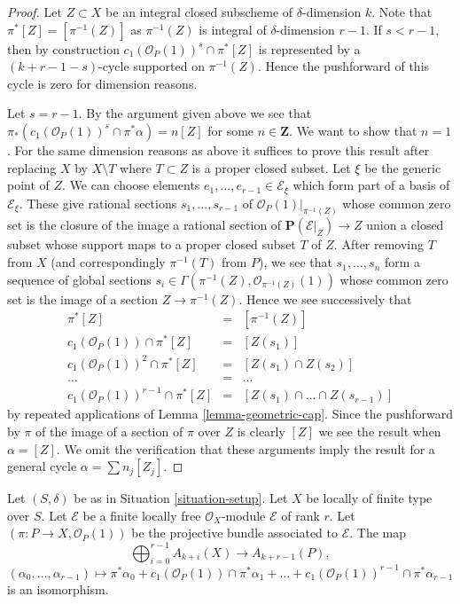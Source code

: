 \begin{proof}
Let $Z \subset X$ be an integral closed subscheme of $\delta$-dimension $k$.
Note that $\pi^*[Z] = [\pi^{-1}(Z)]$ as $\pi^{-1}(Z)$ is integral of
$\delta$-dimension $r - 1$.
If $s < r - 1$, then by construction
$c_1(\mathcal{O}_P(1))^s \cap \pi^*[Z]$
is represented by a $(k + r - 1 - s)$-cycle supported on
$\pi^{-1}(Z)$. Hence the pushforward of this cycle
is zero for dimension reasons.

\medskip\noindent
Let $s = r - 1$. By the argument given above we see that
$\pi_*(c_1(\mathcal{O}_P(1))^s \cap \pi^*\alpha) = n [Z]$
for some $n \in \mathbf{Z}$. We want to show that $n = 1$.
For the same dimension reasons
as above it suffices to prove this result after replacing $X$ by
$X \setminus T$ where $T \subset Z$ is a proper closed subset.
Let $\xi$ be the generic point of $Z$.
We can choose elements $e_1, \ldots, e_{r - 1} \in \mathcal{E}_\xi$
which form part of a basis of $\mathcal{E}_\xi$.
These give rational sections $s_1, \ldots, s_{r - 1}$
of $\mathcal{O}_P(1)|_{\pi^{-1}(Z)}$ whose common zero set
is the closure of the image a rational section of
$\mathbf{P}(\mathcal{E}|_Z) \to Z$ union a closed subset whose
support maps to a proper closed subset $T$ of $Z$.
After removing $T$ from $X$ (and correspondingly $\pi^{-1}(T)$
from $P$), we see that $s_1, \ldots, s_n$ form a sequence
of global sections
$s_i \in \Gamma(\pi^{-1}(Z), \mathcal{O}_{\pi^{-1}(Z)}(1))$
whose common zero set is the image of a section $Z \to \pi^{-1}(Z)$.
Hence we see successively that
\begin{eqnarray*}
\pi^*[Z] & = & [\pi^{-1}(Z)] \\
c_1(\mathcal{O}_P(1)) \cap \pi^*[Z] & = & [Z(s_1)] \\
c_1(\mathcal{O}_P(1))^2 \cap \pi^*[Z] & = & [Z(s_1) \cap Z(s_2)] \\
\ldots & = & \ldots \\
c_1(\mathcal{O}_P(1))^{r - 1} \cap \pi^*[Z] & = &
[Z(s_1) \cap \ldots \cap Z(s_{r - 1})]
\end{eqnarray*}
by repeated applications of Lemma \ref{lemma-geometric-cap}.
Since the pushforward by $\pi$ of the image of a
section of $\pi$ over $Z$ is clearly $[Z]$ we see the result
when $\alpha = [Z]$. We omit the verification that these
arguments imply the result for a general cycle $\alpha = \sum n_j [Z_j]$.
\end{proof}

\begin{lemma}
\label{lemma-chow-ring-projective-bundle}
Let $(S, \delta)$ be as in Situation \ref{situation-setup}.
Let $X$ be locally of finite type over $S$.
Let $\mathcal{E}$ be a finite locally free $\mathcal{O}_X$-module
$\mathcal{E}$ of rank $r$. Let $(\pi : P \to X, \mathcal{O}_P(1))$
be the projective bundle associated to $\mathcal{E}$.
The map
$$
\bigoplus\nolimits_{i = 0}^{r - 1}
A_{k + i}(X)
\longrightarrow
A_{k + r - 1}(P),
$$
$$
(\alpha_0, \ldots, \alpha_{r-1})
\longmapsto
\pi^*\alpha_0 +
c_1(\mathcal{O}_P(1)) \cap \pi^*\alpha_1
+ \ldots +
c_1(\mathcal{O}_P(1))^{r - 1} \cap \pi^*\alpha_{r-1}
$$
is an isomorphism.
\end{lemma}

